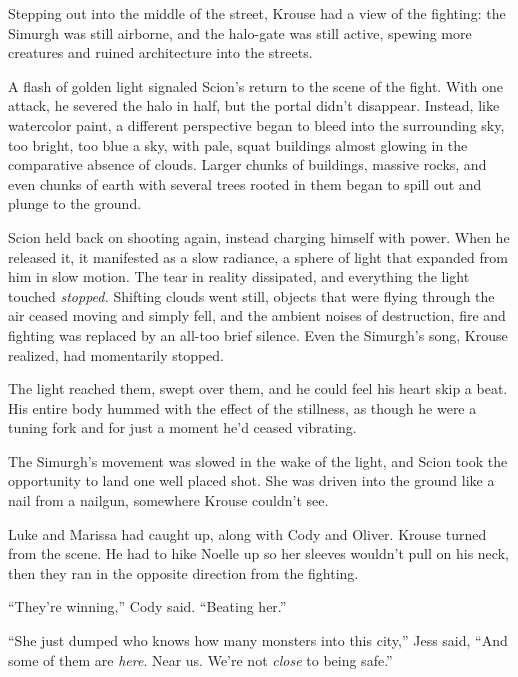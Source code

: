 Stepping out into the middle of the street, Krouse had a view of the fighting: the Simurgh was still airborne, and the halo-gate was still active, spewing more creatures and ruined architecture into the streets.



A flash of golden light signaled Scion's return to the scene of the fight.  With one attack, he severed the halo in half, but the portal didn't disappear.  Instead, like watercolor paint, a different perspective began to bleed into the surrounding sky, too bright, too blue a sky, with pale, squat buildings almost glowing in the comparative absence of clouds.  Larger chunks of buildings, massive rocks, and even chunks of earth with several trees rooted in them began to spill out and plunge to the ground.



Scion held back on shooting again, instead charging himself with power.  When he released it, it manifested as a slow radiance, a sphere of light that expanded from him in slow motion.  The tear in reality dissipated, and everything the light touched \emph{stopped}\emph{.  }Shifting clouds went still, objects that were flying through the air ceased moving and simply fell, and the ambient noises of destruction, fire and fighting was replaced by an all-too brief silence.  Even the Simurgh's song, Krouse realized, had momentarily stopped.



The light reached them, swept over them, and he could feel his heart skip a beat.  His entire body hummed with the effect of the stillness, as though he were a tuning fork and for just a moment he'd ceased vibrating.



The Simurgh's movement was slowed in the wake of the light, and Scion took the opportunity to land one well placed shot.  She was driven into the ground like a nail from a nailgun, somewhere Krouse couldn't see.



Luke and Marissa had caught up, along with Cody and Oliver.  Krouse turned from the scene.  He had to hike Noelle up so her sleeves wouldn't pull on his neck, then they ran in the opposite direction from the fighting.



``They're winning,'' Cody said.  ``Beating her.''



``She just dumped who knows how many monsters into this city,'' Jess said, ``And some of them are \emph{here}.  Near us.  We're not \emph{close} to being safe.''



